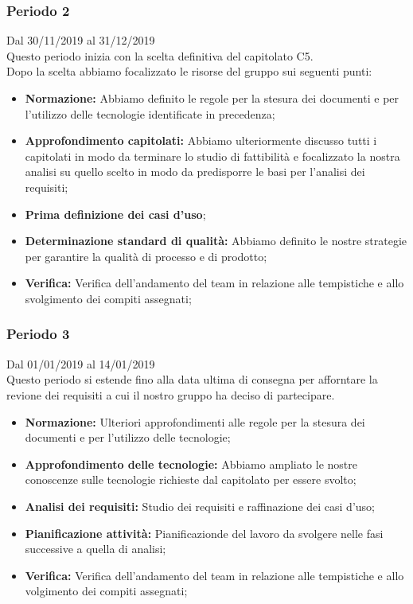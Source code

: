 \subsubsection{Periodo 2} 
Dal 30/11/2019 al 31/12/2019\\
Questo periodo inizia con la scelta definitiva del capitolato C5.\\
Dopo la scelta abbiamo focalizzato le risorse del gruppo sui seguenti punti:
\begin{itemize}
	\item \textbf{Normazione: }Abbiamo definito le regole per la stesura dei documenti e per l'utilizzo delle tecnologie identificate in precedenza;
	\item \textbf{Approfondimento capitolati: }Abbiamo ulteriormente discusso tutti i capitolati in modo da terminare lo studio di fattibilità e focalizzato la nostra analisi su quello scelto in modo da predisporre le basi per l'analisi dei requisiti;
	\item \textbf{Prima definizione dei casi d'uso};
	\item \textbf{Determinazione standard di qualità: }Abbiamo definito le nostre strategie per garantire la qualità di processo e di prodotto;
	\item \textbf{Verifica: }Verifica dell'andamento del team in relazione alle tempistiche e allo svolgimento dei compiti assegnati;
\end{itemize}
\subsubsection{Periodo 3}
 Dal 01/01/2019 al 14/01/2019\\
 Questo periodo si estende fino alla data ultima di consegna per afforntare la revione dei requisiti a cui il nostro gruppo ha deciso di partecipare.\\
 \begin{itemize}
	\item \textbf{Normazione: }Ulteriori approfondimenti alle regole per la stesura dei documenti e per l'utilizzo delle tecnologie;
	\item \textbf{Approfondimento delle tecnologie: }Abbiamo ampliato le nostre conoscenze sulle tecnologie richieste dal capitolato per essere svolto;
	\item \textbf{Analisi dei requisiti: }Studio dei requisiti e raffinazione dei casi d'uso;
	\item \textbf{Pianificazione attività: }Pianificazionde del lavoro da svolgere nelle fasi successive a quella di analisi;
	\item \textbf{Verifica: }Verifica dell'andamento del team in relazione alle tempistiche e allo volgimento dei compiti assegnati;

 \end{itemize}
